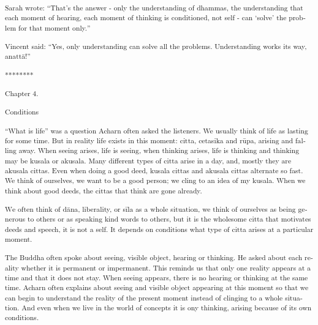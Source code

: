 \textsuperscript{\textdutch{Sarah wrote:
``}\textenglish[variant=american]{That}\textdutch{'}\textenglish[variant=american]{s
the answer - only the understanding of dhammas, the understanding that
each moment of hearing, each moment of thinking is conditioned, not self
- can }\textdutch{`}solve\textdutch{'}\textenglish[variant=american]{
the problem for that moment only.}\textdutch{''}}

\textsuperscript{\textdutch{Vincent said:
``}\textenglish[variant=american]{Yes, only understanding can solve all
the problems. Understanding}\textdutch{
}\textenglish[variant=american]{works its way,
anatt}\textdutch{ā}!\textdutch{''}}

\textsuperscript{\textdutch{********}}

\textsuperscript{\textdutch{Chapter 4.}}

\textsuperscript{\textdutch{Conditions}}

\textsuperscript{``\textdutch{What is life'' was a question Acharn often
asked the listeners. We usually think of life as lasting for some time.
But in reality life exists in this moment: citta, cetasika and rūpa,
arising and falling away. When seeing arises, life is seeing, when
thinking arises, life is thinking and thinking may be kusala or akusala.
M}\textenglish[variant=american]{any different types of citta
aris}\textdutch{e}\textenglish[variant=american]{ in a day, and, mostly
}\textdutch{they are }\textenglish[variant=american]{akusala cittas.
Even when doing a good deed, kusala cittas and akusala cittas alternate
so fast. }\textdutch{We think of ourselves, we want to be a good person;
we cling to an idea of my kusala. }\textenglish[variant=american]{When
we think }\textdutch{about good deeds, the cittas that
think}\textenglish[variant=american]{ are gone already. }}

\textsuperscript{\textdutch{W}\textenglish[variant=american]{e often
think of }\textdutch{dāna, liberality, or sīla as
}\textenglish[variant=american]{a whole situation}\textdutch{, we think
of ourselves as being generous to others or as speaking kind words to
others, but it is the wholesome citta that motivates deeds and speech,
it is not a self. It depends on conditions what type of citta arises at
a particular moment. }}

\textsuperscript{\textdutch{The Buddha often spoke about seeing, visible
object, hearing or thinking. He asked about each reality whether it is
permanent or impermanent. This reminds us that only one reality appears
at a time and that it does not stay. When seeing appears, there is no
hearing or thinking at the same time. Acharn often explains about seeing
and visible object appearing at this moment so that we can begin to
understand the reality of the present moment instead of clinging to a
whole situation. And even when we live in the world of concepts it is
ony thinking, arising because of its own conditions. }}

